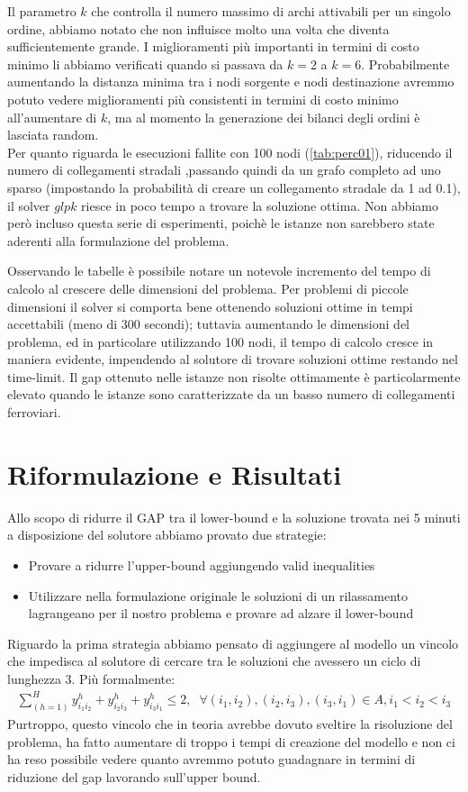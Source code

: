 \documentclass{article}
\begin{document}
Il parametro $k$ che controlla il numero massimo di archi attivabili per un singolo ordine, abbiamo notato che non influisce molto una volta che diventa sufficientemente grande. I miglioramenti più importanti in termini di costo minimo li abbiamo verificati quando si passava da $k = 2$ a $k = 6$. Probabilmente aumentando la distanza minima tra i nodi sorgente e nodi destinazione avremmo potuto vedere miglioramenti più consistenti in termini di costo minimo all'aumentare di $k$, ma al momento la generazione dei bilanci degli ordini è lasciata random.
\\
Per quanto riguarda le esecuzioni fallite con 100 nodi (\cref{tab:perc01}), riducendo il numero di collegamenti stradali ,passando quindi da un grafo completo ad uno sparso (impostando la probabilità di creare un collegamento stradale da 1 ad 0.1), il solver $glpk$ riesce in poco tempo a trovare la soluzione ottima. Non abbiamo però incluso questa serie di esperimenti, poichè le istanze non sarebbero state aderenti alla formulazione del problema.


Osservando le tabelle è possibile notare un notevole incremento del tempo di calcolo al crescere delle dimensioni del problema. Per problemi di piccole dimensioni il solver si comporta bene ottenendo soluzioni ottime in tempi accettabili (meno di 300 secondi); tuttavia aumentando le dimensioni del problema, ed in particolare utilizzando 100 nodi, il tempo di calcolo cresce in maniera evidente, impendendo al solutore di trovare soluzioni ottime restando nel time-limit. 
Il gap ottenuto nelle istanze non risolte ottimamente è particolarmente elevato quando le istanze sono caratterizzate da un basso numero di collegamenti ferroviari.


\section{Riformulazione e Risultati}

Allo scopo di ridurre il GAP tra il lower-bound e la soluzione trovata nei 5 minuti a disposizione del solutore abbiamo provato due strategie:
\begin{itemize}
    \item Provare a ridurre l'upper-bound aggiungendo valid inequalities
    \item Utilizzare nella formulazione originale le soluzioni di un rilassamento lagrangeano per il nostro problema e provare ad alzare il lower-bound
\end{itemize}
Riguardo la prima strategia abbiamo pensato di aggiungere al modello un vincolo che impedisca al solutore di cercare tra le soluzioni che avessero un ciclo di lunghezza 3. Più formalmente:
\begin{align}
    \sum_{(h=1)}^H y_{i_{1}i_{2}}^h + y_{i_{2}i_{3}}^h + y_{i_{3}i_{1}}^h \leq 2, \; \;
    \forall (i_1,i_2), (i_2,i_3), (i_3,i_1)   \in A ,
    i_1 < i_2 < i_3
\end{align}
Purtroppo, questo vincolo che in teoria avrebbe dovuto sveltire la risoluzione del problema, ha fatto aumentare di troppo i tempi di creazione del modello e non ci ha reso possibile vedere quanto avremmo potuto guadagnare in termini di riduzione del gap lavorando sull'upper bound.
\end{document}
